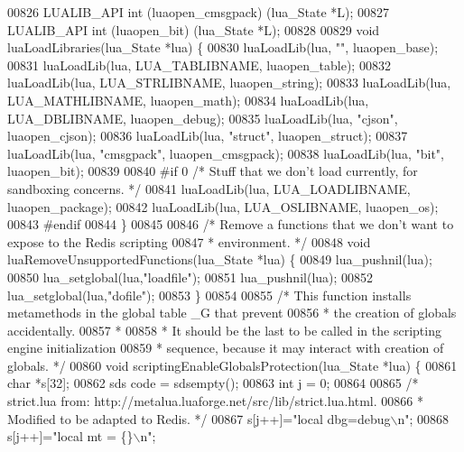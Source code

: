 \begin{DoxyCode}
{{{{{{{{00826 LUALIB\_API \textcolor{keywordtype}{int} (luaopen\_cmsgpack) (lua\_State *L);
00827 LUALIB\_API \textcolor{keywordtype}{int} (luaopen\_bit) (lua\_State *L);
00828 
00829 \textcolor{keywordtype}{void} luaLoadLibraries(lua\_State *lua) \{
00830     luaLoadLib(lua, \textcolor{stringliteral}{""}, luaopen\_base);
00831     luaLoadLib(lua, LUA\_TABLIBNAME, luaopen\_table);
00832     luaLoadLib(lua, LUA\_STRLIBNAME, luaopen\_string);
00833     luaLoadLib(lua, LUA\_MATHLIBNAME, luaopen\_math);
00834     luaLoadLib(lua, LUA\_DBLIBNAME, luaopen\_debug);
00835     luaLoadLib(lua, \textcolor{stringliteral}{"cjson"}, luaopen\_cjson);
00836     luaLoadLib(lua, \textcolor{stringliteral}{"struct"}, luaopen\_struct);
00837     luaLoadLib(lua, \textcolor{stringliteral}{"cmsgpack"}, luaopen\_cmsgpack);
00838     luaLoadLib(lua, \textcolor{stringliteral}{"bit"}, luaopen\_bit);
00839 
00840 \textcolor{preprocessor}{#}\textcolor{preprocessor}{if} 0 \textcolor{comment}{/* Stuff that we don't load currently, for sandboxing concerns. */}
00841     luaLoadLib(lua, LUA\_LOADLIBNAME, luaopen\_package);
00842     luaLoadLib(lua, LUA\_OSLIBNAME, luaopen\_os);
00843 \textcolor{preprocessor}{#}\textcolor{preprocessor}{endif}
00844 \}
00845 
00846 \textcolor{comment}{/* Remove a functions that we don't want to expose to the Redis scripting}
00847 \textcolor{comment}{ * environment. */}
00848 \textcolor{keywordtype}{void} luaRemoveUnsupportedFunctions(lua\_State *lua) \{
00849     lua\_pushnil(lua);
00850     lua\_setglobal(lua,\textcolor{stringliteral}{"loadfile"});
00851     lua\_pushnil(lua);
00852     lua\_setglobal(lua,\textcolor{stringliteral}{"dofile"});
00853 \}
00854 
00855 \textcolor{comment}{/* This function installs metamethods in the global table \_G that prevent}
00856 \textcolor{comment}{ * the creation of globals accidentally.}
00857 \textcolor{comment}{ *}
00858 \textcolor{comment}{ * It should be the last to be called in the scripting engine initialization}
00859 \textcolor{comment}{ * sequence, because it may interact with creation of globals. */}
00860 \textcolor{keywordtype}{void} scriptingEnableGlobalsProtection(lua\_State *lua) \{
00861     \textcolor{keywordtype}{char} *s[32];
00862     sds code = sdsempty();
00863     \textcolor{keywordtype}{int} j = 0;
00864 
00865     \textcolor{comment}{/* strict.lua from: http://metalua.luaforge.net/src/lib/strict.lua.html.}
00866 \textcolor{comment}{     * Modified to be adapted to Redis. */}
00867     s[j++]=\textcolor{stringliteral}{"local dbg=debug\(\backslash\)n"};
00868     s[j++]=\textcolor{stringliteral}{"local mt = \{\}\(\backslash\)n"};
}}}}}}}}
\end{DoxyCode}
